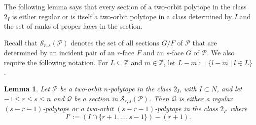 \documentclass[12pt]{article}
\renewcommand{\>}{\rangle}
\renewcommand{\leq}{\leqslant}
\newtheorem{lemma}[theorem]{Lemma}
\theoremstyle{definition}\newtheorem{definition}{Definition}[section]
\begin{document}
The following lemma says that every section of a two-orbit polytope in the class $2_I$ is either regular or is itself a two-orbit polytope in a class determined by $I$ and the set of ranks of proper faces in the section. 

Recall that $\mathcal{S}_{r,s}(\mathcal{P})$ denotes the set of all sections $G/F$ of $\mathcal{P}$ that are determined by an incident pair of an $r$-face $F$ and an $s$-face $G$ of $\mathcal{P}$. We also require the following notation. For $L\subseteq \mathbb{Z}$ and $m\in\mathbb{Z}$, let $L-m:=\{l-m\mid l\in L\}$.

\begin{lemma}
\label{sect2orbit}
Let $\mathcal{P}$ be a two-orbit $n$-polytope in the class $2_I$, with $I\subset N$, and let $-1\leq r\leq s\leq n$ and $\mathcal{Q}$ be a section in $\mathcal{S}_{r,s}(\mathcal{P})$. Then $\mathcal{Q}$ is either a regular $(s-r-1)$-polytope or a two-orbit $(s-r-1)$-polytope in the class $2_{I'}$ where 
\[I':=(I\cap \{r+1,\ldots,s-1\})-(r+1).\]
\end{lemma}
\end{document}
